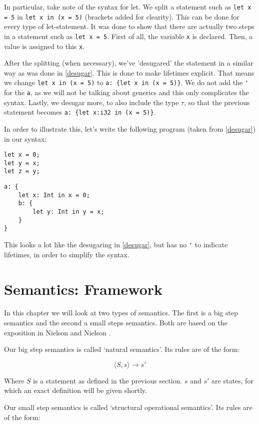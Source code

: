 In particular, take note of the syntax for let. We split a statement such as \verb|let x = 5| in \verb|let x in (x = 5)| (brackets added for clearity). This can be done for every type of let-statement. It was done to show that there are actually two steps in a statement such as \verb|let x = 5|. First of all, the variable \verb|x| is declared. Then, a value is assigned to this \verb|x|. 

After the splitting (when necessary), we've 'desugared' the statement in a similar way as was done in \ref{desugar}. This is done to make lifetimes explicit. That means we change \verb|let x in (x = 5)| to \verb|a: {let x in (x = 5)}|. We do not add the \verb|'| for the \verb|a|, as we will not be talking about generics and this only complicates the syntax. Lastly, we desugar more, to also include the type $\tau$, so that the previous statement becomes \verb|a: {let x:i32 in (x = 5)}|. 

In order to illustrate this, let's write the following program (taken from \ref{desugar}) in our syntax: 

\begin{verbatim}
let x = 0;
let y = x;
let z = y;
\end{verbatim}

\begin{verbatim}
a: {
    let x: Int in x = 0;
    b: {
        let y: Int in y = x;
    }
}
\end{verbatim}

This looks a lot like the desugaring in \ref{desugar}, but has no \verb|'| to indicate lifetimes, in order to simplify the syntax.


\section{Semantics: Framework}
In this chapter we will look at two types of semantics. The first is a big step semantics and the second a small steps semantics. Both are based on the exposition in Nielson and Nielson \cite{nielson1992semantics}. 

Our big step semantics is called `natural semantics'. Its rules are of the form: 

$$\langle S, s \rangle \to s'$$

Where $S$ is a statement as defined in the previous section. $s$ and $s'$ are states, for which an exact definition will be given shortly. 

Our small step semantics is called `structural operational semantics'. Its rules are of the form:

